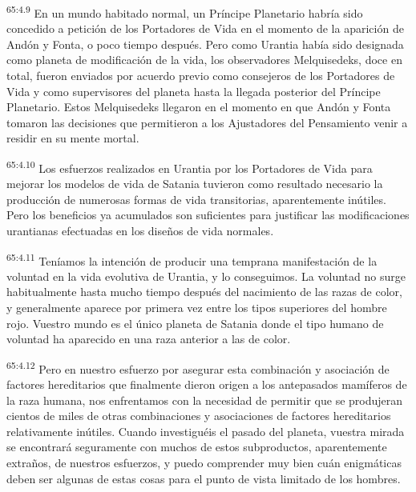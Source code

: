\par
\textsuperscript{65:4.9} En un mundo habitado normal, un Príncipe Planetario habría sido concedido a petición de los Portadores de Vida en el momento de la aparición de Andón y Fonta, o poco tiempo después. Pero como Urantia había sido designada como planeta de modificación de la vida, los observadores Melquisedeks, doce en total, fueron enviados por acuerdo previo como consejeros de los Portadores de Vida y como supervisores del planeta hasta la llegada posterior del Príncipe Planetario. Estos Melquisedeks llegaron en el momento en que Andón y Fonta tomaron las decisiones que permitieron a los Ajustadores del Pensamiento venir a residir en su mente mortal.

\par
\textsuperscript{65:4.10} Los esfuerzos realizados en Urantia por los Portadores de Vida para mejorar los modelos de vida de Satania tuvieron como resultado necesario la producción de numerosas formas de vida transitorias, aparentemente inútiles. Pero los beneficios ya acumulados son suficientes para justificar las modificaciones urantianas efectuadas en los diseños de vida normales.

\par
\textsuperscript{65:4.11} Teníamos la intención de producir una temprana manifestación de la voluntad en la vida evolutiva de Urantia, y lo conseguimos. La voluntad no surge habitualmente hasta mucho tiempo después del nacimiento de las razas de color, y generalmente aparece por primera vez entre los tipos superiores del hombre rojo. Vuestro mundo es el único planeta de Satania donde el tipo humano de voluntad ha aparecido en una raza anterior a las de color.

\par
\textsuperscript{65:4.12} Pero en nuestro esfuerzo por asegurar esta combinación y asociación de factores hereditarios que finalmente dieron origen a los antepasados mamíferos de la raza humana, nos enfrentamos con la necesidad de permitir que se produjeran cientos de miles de otras combinaciones y asociaciones de factores hereditarios relativamente inútiles. Cuando investiguéis el pasado del planeta, vuestra mirada se encontrará seguramente con muchos de estos subproductos, aparentemente extraños, de nuestros esfuerzos, y puedo comprender muy bien cuán enigmáticas deben ser algunas de estas cosas para el punto de vista limitado de los hombres.

